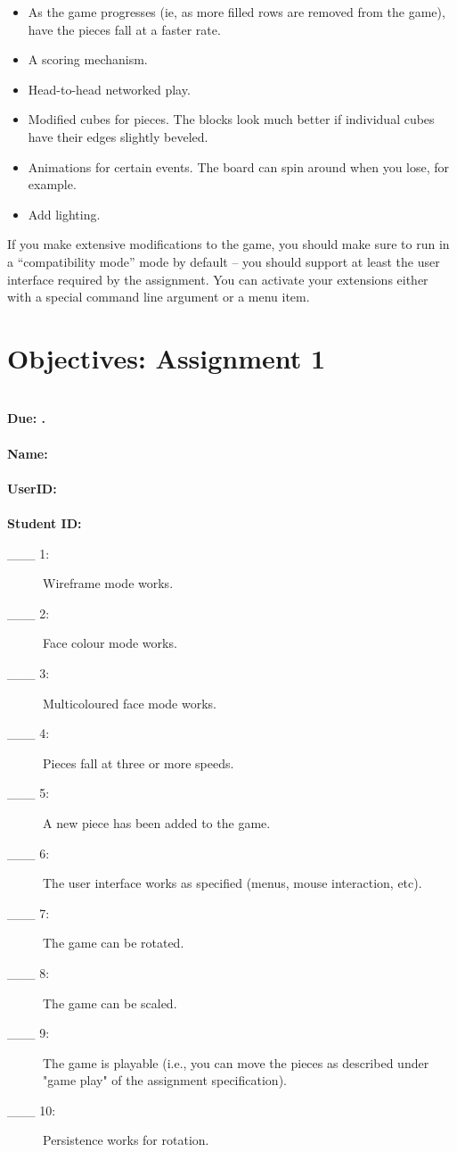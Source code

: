 \begin{itemize}
  \item As the game progresses (ie, as more filled rows are removed from
    the game), have the pieces fall at a faster rate.  

	\item A scoring mechanism.
	\item Head-to-head networked play.
	\item Modified cubes for pieces.  The blocks look much better
		  if individual cubes have their edges slightly beveled.
	\item Animations for certain events.  The board can spin around
		  when you lose, for example.
	\item Add lighting.
\end{itemize}

If you make extensive modifications to the game, you should make
sure to run in a ``compatibility mode'' mode by default -- you should
support at least the user interface required by the assignment.
You can activate your extensions either with a special command line
argument or a menu item.

\newpage
\section{Objectives: \hfill Assignment 1}
\ \\ {\large \bf Due: \AoneDeadline.} \\
\ \\ {\large \bf Name: \hrulefill} \\
\ \\ {\large \bf UserID: \hrulefill} \\
\ \\ {\large \bf Student ID: \hrulefill} \\
\begin{description}
        \item[\_\_\_ 1:]
          Wireframe mode works.
        \item[\_\_\_ 2:]
          Face colour mode works.
        \item[\_\_\_ 3:]
       	  Multicoloured face mode works.
        \item[\_\_\_ 4:]
          Pieces fall at three or more speeds.
        \item[\_\_\_ 5:]
          A new piece has been added to the game.
        \item[\_\_\_ 6:]
          The user interface works as specified (menus, mouse
          interaction, etc).
        \item[\_\_\_ 7:]
          The game can be rotated.
        \item[\_\_\_ 8:]
          The game can be scaled.
        \item[\_\_\_ 9:]
          The game is playable (i.e., you can move the pieces as described 
		under "game play" of the assignment specification).
        \item[\_\_\_ 10:]
          Persistence works for rotation.
\end{description}




